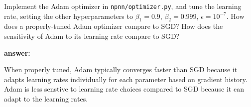 \documentclass[a3paper,12pt]{extarticle} %
\begin{document}
Implement the Adam optimizer in \texttt{npnn/optimizer.py}, and tune the learning rate, setting the other hyperparameters to $\beta_1 = 0.9$, $\beta_2 = 0.999$, $\epsilon = 10^{-7}$. How does a properly-tuned Adam optimizer compare to SGD? How does the sensitivity of Adam to its learning rate compare to SGD?

\textbf{answer:}

When properly tuned, Adam typically converges faster than SGD because it adapts learning rates individually for each parameter based on gradient history. Adam is less senstive to learning rate choices compared to SGD because it can adapt to the learning rates.
\end{document}
